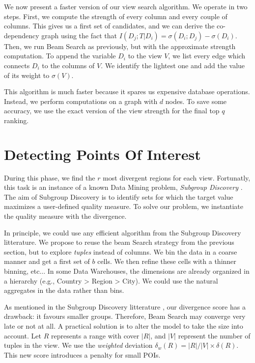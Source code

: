 We now present a faster version of our view search algorithm.  We operate in
two steps. First, we compute the strength of every column and every couple of
columns.  This gives us a first set of candidates, and we can derive the
co-dependency graph using the fact that $I(D_{j} ; T | D_i) = \sigma(D_i ;
D_{j}) - \sigma(D_i)$.  Then, we run Beam Search as previously, but with the
approximate strength computation.  To append the variable $D_i$ to the view
$V$, we list every edge which connects  $D_i$ to the columns of $V$. We
identify the lightest one and add the value of its weight to $\sigma(V)$.  

This algorithm is much faster because it spares us expensive database
operations. Instead, we perform computations on a graph with $d$ nodes.  To
save some accuracy, we use the exact version of the view strength for the final
top $q$ ranking.

\section{Detecting Points Of Interest}
\label{sec:detec}

During this phase, we find the $r$ most divergent regions for each view.
Fortunatly, this task is an instance of a known Data Mining problem,
\emph{Subgroup Discovery} \cite{klosgen1996explora}\cite{wrobel1997algorithm}.
The aim of Subgroup Discovery is to identify sets for which the target value
maximizes a user-defined quality measure. To solve our problem, we instantiate
the quality measure with the divergence.

In principle, we could use any efficient algorithm from the Subgroup Discovery
litterature.  We propose to reuse the beam Search strategy from the previous
section, but to explore \emph{tuples} instead of columns. We bin the data in a
coarse manner and get a first set of $b$ cells. We then refine these cells with
a thinner binning, etc...  In some Data Warehouses, the dimensions are already
organized in a hierarchy (e.g., Country > Region > City). We could use the
natural aggregates in the data rather than bins.

As mentioned in the Subgroup Discovery litterature \cite{van2011non}, our
divergence score has a drawback: it favours smaller groups.  Therefore, Beam
Search may converge very late or not at all.  A practical
solution is to alter the model to take the size into account. Let $R$
represents a range with cover $|R|$, and $|V|$ represent the number of tuples
in the view. We use the \emph{weighted} deviation $\delta_w(R) = |R|/|V| \times
\delta(R)$. This new score introduces a penalty for small POIs.


